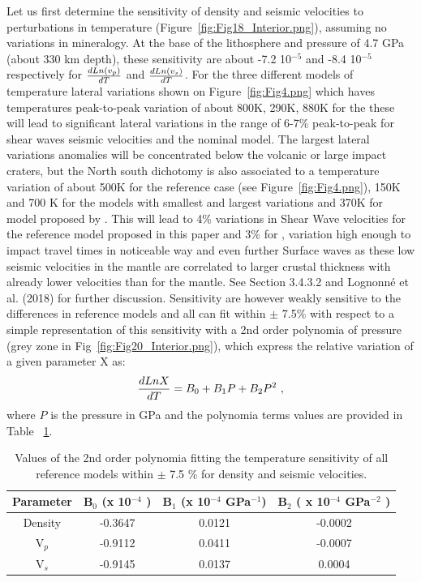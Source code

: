 Let us first determine the sensitivity of density and seismic velocities to perturbations in temperature (Figure~\ref{fig:Fig18_Interior.png}), assuming no variations in mineralogy. At the base of the lithosphere and pressure of 4.7 GPa (about 330 km depth), these sensitivity are about -7.2 10$^{-5}$ and -8.4 10$^{-5}$ respectively for ${dLn(v_p) \over dT}$ and ${dLn(v_s) \over dT}$. For the three different models of temperature lateral variations shown on Figure~\ref{fig:Fig4.png} which haves temperatures peak-to-peak variation of about 800K, 290K, 880K for the these will lead to significant lateral variations in the range of 6-7\% peak-to-peak for shear waves seismic velocities and the nominal model. The largest lateral variations anomalies will be concentrated below the volcanic or large impact craters, but the  North south dichotomy is also associated to a temperature variation of about 500K for the reference case (see Figure~\ref{fig:Fig4.png}), 150K and 700 K for the models with smallest and largest variations and 370K for model proposed by \citep{Thiriet2018}. This will lead to 4\% variations in Shear Wave velocities for the reference model proposed in this paper and 3\% for \citep{Thiriet2018}, variation high enough to impact travel times in noticeable way and even further Surface waves as these low seismic velocities in the mantle are correlated to larger crustal thickness with already lower velocities than for the mantle. See Section 3.4.3.2 and Lognonn\'e et al. (2018) for further discussion. Sensitivity are however weakly sensitive to the differences in reference models and all can fit within $\pm$ 7.5\% with respect to a simple representation of this sensitivity with a 2nd order polynomia of pressure (grey zone in Fig~\ref{fig:Fig20_Interior.png}), which express the relative variation of a given parameter X as:
\begin{equation}
{d Ln X \over dT } = B_0 + B_1 P + B_2 P^2 \ ,
\end{equation}
where $P$ is the pressure in GPa and the polynomia terms values are provided in Table ~\ref{table:TableEmp}.

\begin{table}
\centering
\begin{tabular}{|c|c|c|c|}
\hline
Parameter & B$_0$ (x 10$^{-4}$ ) & B$_1$  (x 10$^{-4}$ GPa$^{-1}$) & B$_2$  ( x 10$^{-4}$ GPa$^{-2}$ ) \\
\hline
Density & -0.3647 & 0.0121 & -0.0002 \\
\hline
V$_p$ & -0.9112 & 0.0411   & -0.0007 \\
\hline
V$_s$ & -0.9145 & 0.0137   &  0.0004 \\
\hline
\end{tabular}
\caption{ Values of the 2nd order polynomia fitting the temperature sensitivity of all reference models within $\pm$ 7.5 \% for density and seismic velocities.}
\label{table:TableEmp}
\end{table}


